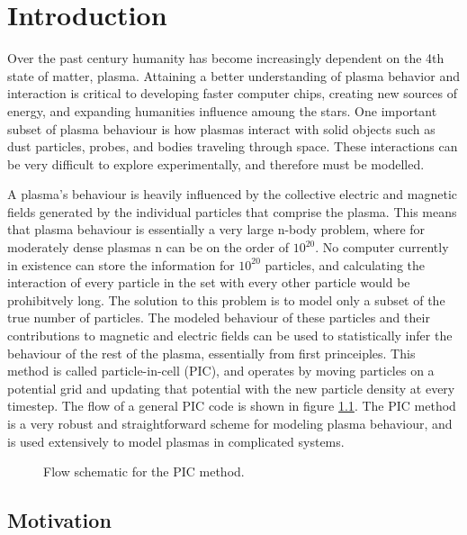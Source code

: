
\chapter{Introduction}
	Over the past century humanity has become increasingly dependent on the 4th state of matter, plasma. Attaining a better understanding of plasma behavior and interaction is critical to developing faster computer chips, creating new sources of energy, and expanding humanities influence amoung the stars. One important subset of plasma behaviour is how plasmas interact with solid objects such as dust particles, probes, and bodies traveling through space. These interactions can be very difficult to explore experimentally, and therefore must be modelled. 
	
A plasma's behaviour is heavily influenced by the collective electric and magnetic fields generated by the individual particles that comprise the plasma. This means that plasma behaviour is essentially a very large n-body problem, where for moderately dense plasmas n can be on the order of $10^{20}$. No computer currently in existence can store the information for $10^{20}$ particles, and calculating the interaction of every particle in the set with every other particle would be prohibitvely long. The solution to this problem is to model only a subset of the true number of particles. The modeled behaviour of these particles and their contributions to magnetic and electric fields can be used to statistically infer the behaviour of the rest of the plasma, essentially from first princeiples. This method is called particle-in-cell (PIC), and operates by moving particles on a potential grid and updating that potential with the new particle density at every timestep. The flow of a general PIC code is shown in figure \ref{fig:pic_flowchart}. The PIC method is a very robust and straightforward scheme for modeling plasma behaviour, and is used extensively to model plasmas in complicated systems.

\begin{figure}
\begin{center}

\end{center}
\caption{Flow schematic for the PIC method.}
\label{fig:pic_flowchart}
\end{figure}


	\section{Motivation}

